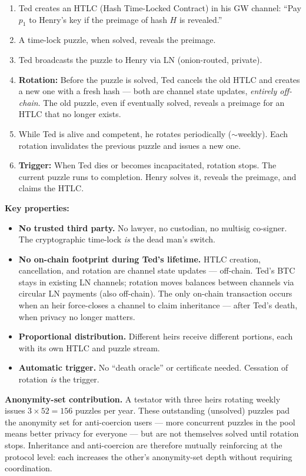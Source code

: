 \documentclass[a4paper,11pt]{article}
\begin{document}
\begin{enumerate}[nosep,leftmargin=1.5em]
  \item Ted creates an HTLC (Hash Time-Locked Contract) in his GW channel: ``Pay $p_1$ to Henry's key if the preimage of hash $H$ is revealed.''
  \item A time-lock puzzle, when solved, reveals the preimage.
  \item Ted broadcasts the puzzle to Henry via LN (onion-routed, private).
  \item \textbf{Rotation:} Before the puzzle is solved, Ted cancels the old HTLC and creates a new one with a fresh hash --- both are channel state updates, \textit{entirely off-chain}. The old puzzle, even if eventually solved, reveals a preimage for an HTLC that no longer exists.
  \item While Ted is alive and competent, he rotates periodically ($\sim$weekly). Each rotation invalidates the previous puzzle and issues a new one.
  \item \textbf{Trigger:} When Ted dies or becomes incapacitated, rotation stops. The current puzzle runs to completion. Henry solves it, reveals the preimage, and claims the HTLC.
\end{enumerate}

\noindent\textbf{Key properties:}

\begin{itemize}[nosep,leftmargin=1.5em]
  \item \textbf{No trusted third party.} No lawyer, no custodian, no multisig co-signer. The cryptographic time-lock \textit{is} the dead man's switch.
  \item \textbf{No on-chain footprint during Ted's lifetime.} HTLC creation, cancellation, and rotation are channel state updates --- off-chain. Ted's BTC stays in existing LN channels; rotation moves balances between channels via circular LN payments (also off-chain). The only on-chain transaction occurs when an heir force-closes a channel to claim inheritance --- after Ted's death, when privacy no longer matters.
  \item \textbf{Proportional distribution.} Different heirs receive different portions, each with its own HTLC and puzzle stream.
  \item \textbf{Automatic trigger.} No ``death oracle'' or certificate needed. Cessation of rotation \textit{is} the trigger.
\end{itemize}

\noindent\textbf{Anonymity-set contribution.} A testator with three heirs rotating weekly issues $3 \times 52 = 156$ puzzles per year. These outstanding (unsolved) puzzles pad the anonymity set for anti-coercion users --- more concurrent puzzles in the pool means better privacy for everyone --- but are not themselves solved until rotation stops. Inheritance and anti-coercion are therefore mutually reinforcing at the protocol level: each increases the other's anonymity-set depth without requiring coordination.
\end{document}
